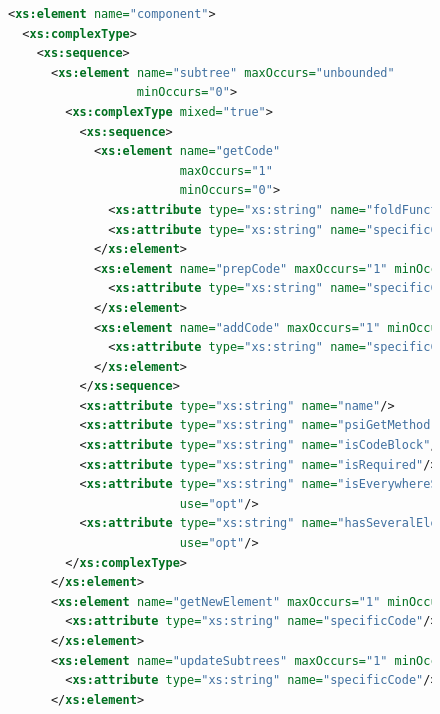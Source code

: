 \begin{figure}[H]
\begin{lstlisting}[language=xml]
<xs:element name="component">
  <xs:complexType>
    <xs:sequence>
      <xs:element name="subtree" maxOccurs="unbounded" 
                  minOccurs="0">
        <xs:complexType mixed="true">
          <xs:sequence>
            <xs:element name="getCode" 
                        maxOccurs="1" 
                        minOccurs="0">
              <xs:attribute type="xs:string" name="foldFunction"/>
              <xs:attribute type="xs:string" name="specificCode"/>
            </xs:element>
            <xs:element name="prepCode" maxOccurs="1" minOccurs="0">
              <xs:attribute type="xs:string" name="specificCode"/>
            </xs:element>
            <xs:element name="addCode" maxOccurs="1" minOccurs="0">
              <xs:attribute type="xs:string" name="specificCode"/>
            </xs:element>
          </xs:sequence>
          <xs:attribute type="xs:string" name="name"/>
          <xs:attribute type="xs:string" name="psiGetMethod"/>
          <xs:attribute type="xs:string" name="isCodeBlock"/>
          <xs:attribute type="xs:string" name="isRequired"/>
          <xs:attribute type="xs:string" name="isEverywhereSuit" 
                        use="opt"/>
          <xs:attribute type="xs:string" name="hasSeveralElements" 
                        use="opt"/>
        </xs:complexType>
      </xs:element>    
      <xs:element name="getNewElement" maxOccurs="1" minOccurs="0">
        <xs:attribute type="xs:string" name="specificCode"/>
      </xs:element>
      <xs:element name="updateSubtrees" maxOccurs="1" minOccurs="0">
        <xs:attribute type="xs:string" name="specificCode"/>
      </xs:element>
    \end{lstlisting}
\end{figure}
